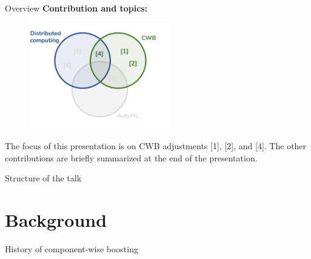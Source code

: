 \documentclass[t,10pt]{beamer}
\begin{document}
\begin{frame}{Overview}
  \textbf{Contribution and topics:}
  \begin{figure}
    \centering
    \includegraphics[width=0.55\textwidth]{figures/topics-relevant.png}
  \end{figure}\vspace{-0.2cm}
  The focus of this presentation is on CWB adjustments {[}1{]}, {[}2{]}, and {[}4{]}. The other contributions are briefly summarized at the end of the presentation.
	\addtocounter{framenumber}{-1}
\end{frame}


\begin{frame}{Structure of the talk}
  \tableofcontents
\end{frame}

\section{Background}

\begin{frame}{History of component-wise boosting}

\end{frame}
\end{document}
